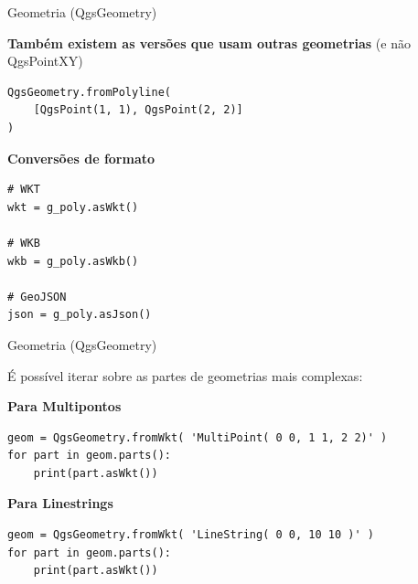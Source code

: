 \documentclass{beamer}
\begin{document}
\begin{frame}[fragile]{Geometria (QgsGeometry)}
    
    \textbf{Também existem as versões que usam outras geometrias} (e não QgsPointXY)
    
    \begin{verbatim}
QgsGeometry.fromPolyline(
    [QgsPoint(1, 1), QgsPoint(2, 2)]
)
    \end{verbatim}
    
    \textbf{Conversões de formato}
    
    \begin{verbatim}
# WKT
wkt = g_poly.asWkt()

# WKB
wkb = g_poly.asWkb()

# GeoJSON
json = g_poly.asJson()
    \end{verbatim}
\end{frame}


\begin{frame}[fragile]{Geometria (QgsGeometry)}
    
    É possível iterar sobre as partes de geometrias mais complexas:
    
    \textbf{Para Multipontos}
    \begin{verbatim}
geom = QgsGeometry.fromWkt( 'MultiPoint( 0 0, 1 1, 2 2)' )
for part in geom.parts():
    print(part.asWkt())
    \end{verbatim}
    
    \textbf{Para Linestrings}
    
    \begin{verbatim}
geom = QgsGeometry.fromWkt( 'LineString( 0 0, 10 10 )' )
for part in geom.parts():
    print(part.asWkt())
    \end{verbatim}
\end{frame}
\end{document}
